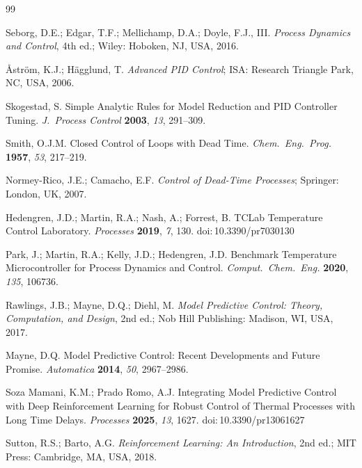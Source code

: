 \documentclass[processes,article,submit,moreauthors,pdftex]{Definitions/mdpi}
\providecommand{\doi}[1]{doi:\,#1}
\begin{document}
\begin{thebibliography}{99}

Seborg, D.E.; Edgar, T.F.; Mellichamp, D.A.; Doyle, F.J., III.
\textit{Process Dynamics and Control}, 4th ed.;
Wiley: Hoboken, NJ, USA, 2016.

Åström, K.J.; Hägglund, T.
\textit{Advanced PID Control};
ISA: Research Triangle Park, NC, USA, 2006.

Skogestad, S.
Simple Analytic Rules for Model Reduction and PID Controller Tuning.
\textit{J.\ Process Control} \textbf{2003}, \textit{13}, 291--309.

Smith, O.J.M.
Closed Control of Loops with Dead Time.
\textit{Chem.\ Eng.\ Prog.} \textbf{1957}, \textit{53}, 217--219.

Normey-Rico, J.E.; Camacho, E.F.
\textit{Control of Dead-Time Processes};
Springer: London, UK, 2007.

Hedengren, J.D.; Martin, R.A.; Nash, A.; Forrest, B.
TCLab Temperature Control Laboratory.
\textit{Processes} \textbf{2019}, \textit{7}, 130.
\doi{10.3390/pr7030130}

Park, J.; Martin, R.A.; Kelly, J.D.; Hedengren, J.D.
Benchmark Temperature Microcontroller for Process Dynamics and Control.
\textit{Comput.\ Chem.\ Eng.} \textbf{2020}, \textit{135}, 106736.

Rawlings, J.B.; Mayne, D.Q.; Diehl, M.
\textit{Model Predictive Control: Theory, Computation, and Design},
2nd ed.; Nob Hill Publishing: Madison, WI, USA, 2017.

Mayne, D.Q.
Model Predictive Control: Recent Developments and Future Promise.
\textit{Automatica} \textbf{2014}, \textit{50}, 2967--2986.

Soza Mamani, K.M.; Prado Romo, A.J.
Integrating Model Predictive Control with Deep Reinforcement Learning for
Robust Control of Thermal Processes with Long Time Delays.
\textit{Processes} \textbf{2025}, \textit{13}, 1627.
\doi{10.3390/pr13061627}

Sutton, R.S.; Barto, A.G.
\textit{Reinforcement Learning: An Introduction}, 2nd ed.;
MIT Press: Cambridge, MA, USA, 2018.


\end{thebibliography}
\end{document}
